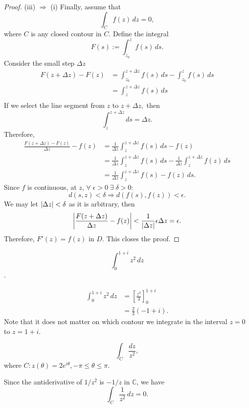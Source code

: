 \documentclass[12pt]{book}
\begin{document}
\begin{proof}
    \noindent (iii) $\Rightarrow$ (i)
    Finally, assume that 
    \[
        \int_{C} f(z)\,dz = 0,
    \]
    where $C$ is any closed contour in $C.$ Define the integral
    \[
        F(s) := \int_{z_0}^{z}f(s)\,ds.
    \]
    Consider the small step $\Delta z$
    \begin{align*}
        F(z + \Delta z) - F(z) 
            &= 
                \int_{z_0}^{z + \Delta z}f(s)\,ds - \int_{z_0}^{z}f(s)\,ds \\
            &= 
                \int_{z}^{z + \Delta z}f(s)\,ds \\
    \end{align*}
    If we select the line segment from $z$ to $z + \Delta z,$ then
    \[
        \int_{z}^{z + \Delta z} ds = \Delta z.
    \]
    Therefore,
    \begin{align*}
        \frac{F(z + \Delta z) - F(z)}{\Delta z} - f(z)
            &=
                \frac{1}{\Delta z}\int_{z}^{z + \Delta z} f(s)\,ds - f(z) \\
            &=
                \frac{1}{\Delta z}\int_{z}^{z + \Delta z} f(s)\,ds - \frac{1}{\Delta z}\int_{z}^{z + \Delta z} f(z)\,ds \\
            &=
                \frac{1}{\Delta z}\int_{z}^{z + \Delta z} f(s) - f(z)\,ds.
    \end{align*}
    Since $f$ is continuous, at $z$, $\forall\; \epsilon > 0 \;\exists\; \delta > 0:$
    \[
        d(s, z) < \delta \Rightarrow d(f(s), f(z)) < \epsilon.
    \] 
    We may let $\left\lvert \Delta z \right\rvert < \delta$ as it is arbitrary, then
    \[
        \left\lvert \frac{F(z + \Delta z)}{\Delta z} - f(z) \right\rvert < \frac{1}{\left\lvert \Delta z \right\rvert} \epsilon \Delta z = \epsilon.
    \]
    Therefore, $F'(z) = f(z)$ in $D.$ This closes the proof.
\end{proof}

\begin{exmp}
    \[\int_{0}^{1 + i} z^2\,dz\].
\end{exmp}
\begin{align*}
    \int_{0}^{1 + i} z^2\,dz
        &=
            \left[\frac{z^3}{3}\right]_{0}^{1 + i} \\
        &=
            \frac{2}{3}(-1 + i).
\end{align*}
Note that it does not matter on which contour we integrate in the interval $z = 0$ to $z = 1+ i.$

\begin{exmp}
    \[
        \int_{C} \frac{dz}{z^2},
    \]
    where $C: z(\theta) = 2e^{i\theta}, -\pi \leq \theta \leq \pi.$
\end{exmp}
Since the antiderivative of $1/z^2$ is $-1/z$ in $\mathbb{C}$, we have 
\[
    \int_{C} \frac{1}{z^{2}}\,dz = 0.
\]
\end{document}
